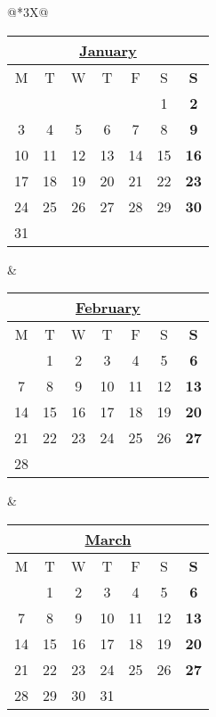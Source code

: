 \documentclass[9pt]{extarticle}
\begin{document}
    
    

    



    \begin{tabularx}{\linewidth}{@{}*{3}{X}@{}}
    {\renewcommand{\arraystretch}{\myNumArrayStretch}\setlength{\tabcolsep}{\myLenTabColSep}%
        \begin{tabular}[t]{c c c c c c >{\bf}c}
            \multicolumn{7}{c}{\hyperlink{January}{January}} \\ \hline
            M & T & W & T& F & S & S \\ \hline
            &  &  &  &  & 1 & 2 \\
            3 & 4 & 5 & 6 & 7 & 8 & 9 \\
            10 & 11 & 12 & 13 & 14 & 15 & 16 \\
            17 & 18 & 19 & 20 & 21 & 22 & 23 \\
            24 & 25 & 26 & 27 & 28 & 29 & 30 \\
            31 &  &  &  &  &  &
        \end{tabular}} & {\renewcommand{\arraystretch}{\myNumArrayStretch}\setlength{\tabcolsep}{\myLenTabColSep}%
    \begin{tabular}[t]{c c c c c c >{\bf}c}
        \multicolumn{7}{c}{\hyperlink{February}{February}} \\ \hline
        M & T & W & T& F & S & S \\ \hline
        & 1 & 2 & 3 & 4 & 5 & 6 \\
        7 & 8 & 9 & 10 & 11 & 12 & 13 \\
        14 & 15 & 16 & 17 & 18 & 19 & 20 \\
        21 & 22 & 23 & 24 & 25 & 26 & 27 \\
        28 &  &  &  &  &  &
    \end{tabular}} & {\renewcommand{\arraystretch}{\myNumArrayStretch}\setlength{\tabcolsep}{\myLenTabColSep}%
    \begin{tabular}[t]{c c c c c c >{\bf}c}
        \multicolumn{7}{c}{\hyperlink{March}{March}} \\ \hline
        M & T & W & T& F & S & S \\ \hline
        & 1 & 2 & 3 & 4 & 5 & 6 \\
        7 & 8 & 9 & 10 & 11 & 12 & 13 \\
        14 & 15 & 16 & 17 & 18 & 19 & 20 \\
        21 & 22 & 23 & 24 & 25 & 26 & 27 \\
        28 & 29 & 30 & 31 &  &  &
    \end{tabular}}
    \end{tabularx}



\end{document}
